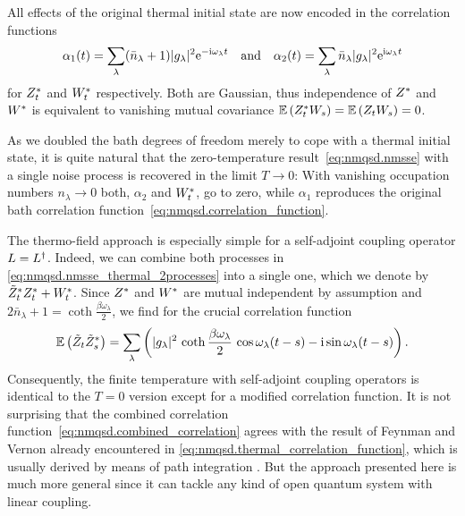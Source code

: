 All effects of the original thermal initial state are now encoded in the correlation functions
\begin{equation}
  \alpha_1(t) = \sum_\lambda (\bar n_\lambda + 1) \abs{g_\lambda}^2 \exp[-\ii\omega_\lambda t] \quad \mbox{and} \quad
  \alpha_2(t) = \sum_\lambda \bar n_\lambda \abs{g_\lambda}^2 \exp[\ii\omega_\lambda t]
  \label{eq:nmqsd.cov_2processes}
\end{equation}
for ${Z}^*_t$ and ${W}^*_t$ respectively.
Both are Gaussian, thus independence of ${Z}^*$ and ${W}^*$ is equivalent to vanishing mutual covariance $\E[\ZZ_t W_s] = \E[Z_t W_s] = 0$.

As we doubled the bath degrees of freedom merely to cope with a thermal initial state, it is quite natural that the zero-temperature result~\ref{eq:nmqsd.nmsse} with a single noise process is recovered in the limit $T \to 0$:
With vanishing occupation numbers $n_\lambda \to 0$ both, $\alpha_2$ and ${W}^*_t$, go to zero, while $\alpha_1$ reproduces the original bath correlation function~\ref{eq:nmqsd.correlation_function}.

The thermo-field approach is especially simple for a self-adjoint coupling operator $L = L^\dagger$.
Indeed, we can combine both processes in \autoref{eq:nmqsd.nmsse_thermal_2processes} into a single one, which we denote by ${\tilde Z}^*_t {Z}^*_t + {W}^*_t$.
Since ${Z}^*$ and ${W}^*$ are mutual independent by assumption and $2\bar n_\lambda + 1 = \coth{\frac{\beta\omega_\lambda}{2}}$, we find for the crucial correlation function
\begin{equation}
  \E[\tilde Z_t \tildeZZ_s] = \sum_\lambda \left(\abs{g_\lambda}^2 \, \coth{\frac{\beta \omega_\lambda}{2}} \, \cos{\omega_\lambda (t-s)} - \ii \sin{\omega_\lambda (t-s)} \right).
  \label{eq:nmqsd.combined_correlation}
\end{equation}
Consequently, the finite temperature \NMSSE with self-adjoint coupling operators is identical to the $T=0$ version except for a modified correlation function.
It is not surprising that the combined correlation function~\ref{eq:nmqsd.combined_correlation} agrees with the result of Feynman and Vernon already encountered in \autoref{eq:nmqsd.thermal_correlation_function}, which is usually derived by means of path integration \cite{FeVe63_quantum_dissipative}.
But the approach presented here is much more general since it can tackle any kind of open quantum system with linear coupling.


